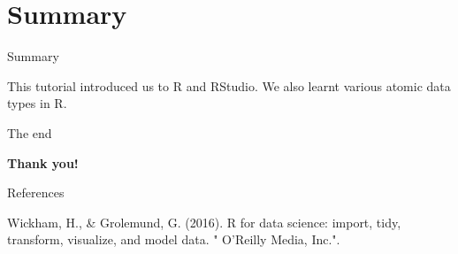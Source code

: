 \documentclass[
  ignorenonframetext,
]{beamer}
\begin{document}
\section{Summary}
\begin{frame}{Summary}
	\protect\hypertarget{summary}{}
	
	This tutorial introduced us to R and RStudio. We also learnt various atomic data types in R.	
\end{frame}


\begin{frame}{The end}
\protect\hypertarget{the-end}{}

\begin{center}
\textbf{Thank you!}
\end{center}

\end{frame}

\begin{frame}{References}
\protect\hypertarget{references}{}

\begin{thebibliography}{99}
Wickham, H., \& Grolemund, G. (2016). R for data science: import, tidy, transform, visualize, and model data. " O'Reilly Media, Inc.".
\end{thebibliography}

\end{frame}
\end{document}
